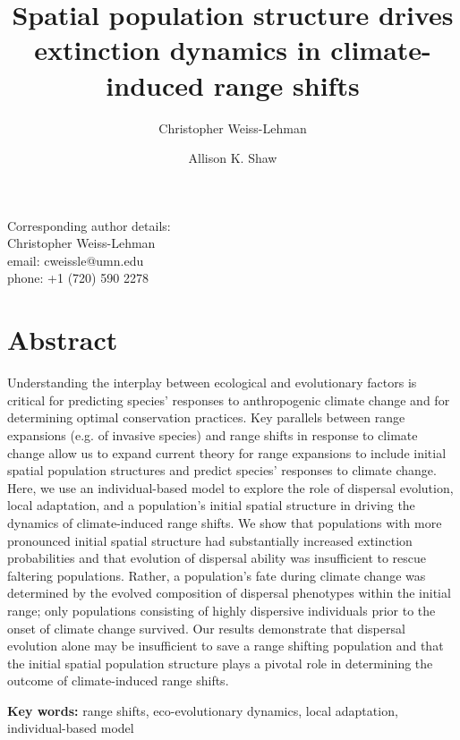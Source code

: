 \documentclass[12pt, oneside]{article}
\title{Spatial population structure drives extinction dynamics in climate-induced range shifts}
\date{}
\author[1,*]{Christopher Weiss-Lehman}
\author[1]{Allison K. Shaw}
\affil[1]{Ecology, Evolution, and Behavior, University of Minnesota}
\affil[*]{Denotes corresponding author}
\begin{document}
\maketitle

\begin{flushleft}
Corresponding author details: \\
Christopher Weiss-Lehman \\
email: cweissle@umn.edu \\
phone: +1 (720) 590 2278 \\
\end{flushleft}

\doublespacing
\linenumbers

\newpage

\section*{Abstract}
Understanding the interplay between ecological and evolutionary factors is critical for predicting species' responses to anthropogenic climate change and for determining optimal conservation practices. Key parallels between range expansions (e.g. of invasive species) and range shifts in response to climate change allow us to expand current theory for range expansions to include initial spatial population structures and predict species' responses to climate change. Here, we use an individual-based model to explore the role of dispersal evolution, local adaptation, and a population's initial spatial structure in driving the dynamics of climate-induced range shifts. We show that populations with more pronounced initial spatial structure had substantially increased extinction probabilities and that evolution of dispersal ability was insufficient to rescue faltering populations. Rather, a population's fate during climate change was determined by the evolved composition of dispersal phenotypes within the initial range; only populations consisting of highly dispersive individuals prior to the onset of climate change survived. Our results demonstrate that dispersal evolution alone may be insufficient to save a range shifting population and that the initial spatial population structure plays a pivotal role in determining the outcome of climate-induced range shifts.

\begin{flushleft}
\textbf{Key words:} range shifts, eco-evolutionary dynamics, local adaptation, individual-based model
\end{flushleft}
\end{document}
